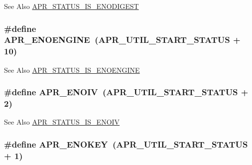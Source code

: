 \begin{DoxySeeAlso}{See Also}
\hyperlink{group___a_p_r___util___error_ga13ab217618d8b37c7d85c7c2080908a0}{A\-P\-R\-\_\-\-S\-T\-A\-T\-U\-S\-\_\-\-I\-S\-\_\-\-E\-N\-O\-D\-I\-G\-E\-S\-T} 
\end{DoxySeeAlso}
\hypertarget{group___a_p_r___util___error_gacda8be948c23dbd1347f3302fb1c577f}{
\subsubsection[{A\-P\-R\-\_\-\-E\-N\-O\-E\-N\-G\-I\-N\-E}]{\setlength{\rightskip}{0pt plus 5cm}\#define A\-P\-R\-\_\-\-E\-N\-O\-E\-N\-G\-I\-N\-E~(A\-P\-R\-\_\-\-U\-T\-I\-L\-\_\-\-S\-T\-A\-R\-T\-\_\-\-S\-T\-A\-T\-U\-S + 10)}}\label{group___a_p_r___util___error_gacda8be948c23dbd1347f3302fb1c577f}
\begin{DoxySeeAlso}{See Also}
\hyperlink{group___a_p_r___util___error_ga9574130dd48e4d76082c7837d052d8d0}{A\-P\-R\-\_\-\-S\-T\-A\-T\-U\-S\-\_\-\-I\-S\-\_\-\-E\-N\-O\-E\-N\-G\-I\-N\-E} 
\end{DoxySeeAlso}
\hypertarget{group___a_p_r___util___error_ga2df3db3a80a6e153134caf5d3a62a00f}{
\subsubsection[{A\-P\-R\-\_\-\-E\-N\-O\-I\-V}]{\setlength{\rightskip}{0pt plus 5cm}\#define A\-P\-R\-\_\-\-E\-N\-O\-I\-V~(A\-P\-R\-\_\-\-U\-T\-I\-L\-\_\-\-S\-T\-A\-R\-T\-\_\-\-S\-T\-A\-T\-U\-S + 2)}}\label{group___a_p_r___util___error_ga2df3db3a80a6e153134caf5d3a62a00f}
\begin{DoxySeeAlso}{See Also}
\hyperlink{group___a_p_r___util___error_ga5d6aa91dabbbaa71f11c293af460b143}{A\-P\-R\-\_\-\-S\-T\-A\-T\-U\-S\-\_\-\-I\-S\-\_\-\-E\-N\-O\-I\-V} 
\end{DoxySeeAlso}
\hypertarget{group___a_p_r___util___error_gabf9bbd463ebcf38611f6acd423e49de9}{
\subsubsection[{A\-P\-R\-\_\-\-E\-N\-O\-K\-E\-Y}]{\setlength{\rightskip}{0pt plus 5cm}\#define A\-P\-R\-\_\-\-E\-N\-O\-K\-E\-Y~(A\-P\-R\-\_\-\-U\-T\-I\-L\-\_\-\-S\-T\-A\-R\-T\-\_\-\-S\-T\-A\-T\-U\-S + 1)}}\label{group___a_p_r___util___error_gabf9bbd463ebcf38611f6acd423e49de9}
